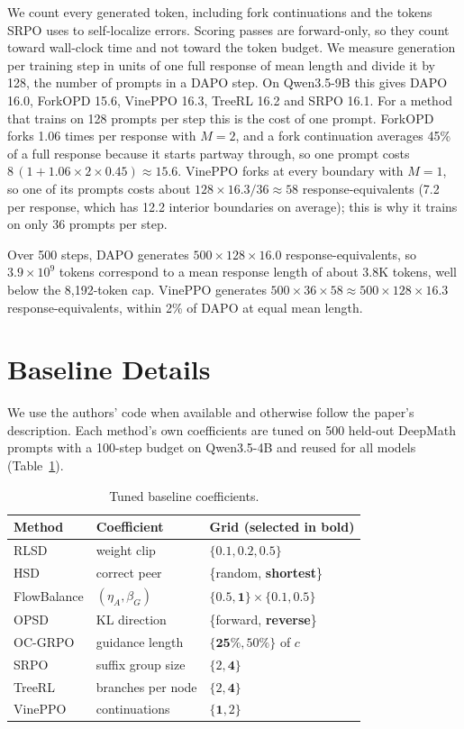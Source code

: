 \documentclass[11pt]{article}
\newcommand{\method}{ForkOPD}
\theoremstyle{remark}
\begin{document}
We count every generated token, including fork continuations and the tokens SRPO uses to self-localize errors. Scoring passes are forward-only, so they count toward wall-clock time and not toward the token budget. We measure generation per training step in units of one full response of mean length and divide it by 128, the number of prompts in a DAPO step. On Qwen3.5-9B this gives DAPO 16.0, \method{} 15.6, VinePPO 16.3, TreeRL 16.2 and SRPO 16.1. For a method that trains on 128 prompts per step this is the cost of one prompt. \method{} forks 1.06 times per response with $M=2$, and a fork continuation averages 45\% of a full response because it starts partway through, so one prompt costs $8\,(1+1.06\times2\times0.45)\approx15.6$. VinePPO forks at every boundary with $M=1$, so one of its prompts costs about $128\times16.3/36\approx58$ response-equivalents (7.2 per response, which has 12.2 interior boundaries on average); this is why it trains on only 36 prompts per step.

Over 500 steps, DAPO generates $500\times128\times16.0$ response-equivalents, so $3.9\times10^9$ tokens correspond to a mean response length of about 3.8K tokens, well below the 8{,}192-token cap. VinePPO generates $500\times36\times58\approx500\times128\times16.3$ response-equivalents, within 2\% of DAPO at equal mean length.

\section{Baseline Details}
\label{app:baselines}

We use the authors' code when available and otherwise follow the paper's description. Each method's own coefficients are tuned on 500 held-out DeepMath prompts with a 100-step budget on Qwen3.5-4B and reused for all models (Table~\ref{tab:baselines}).

\begin{table}[h]
\centering
\small
\setlength{\tabcolsep}{2.5pt}
\footnotesize
\begin{tabular}{lll}
\toprule
Method & Coefficient & Grid (selected in bold) \\
\midrule
RLSD & weight clip & $\{0.1, \mathbf{0.2}, 0.5\}$ \\
HSD & correct peer & \{random, \textbf{shortest}\} \\
FlowBalance & $(\eta_A,\beta_G)$ & $\{0.5,\mathbf{1}\}\times\{\mathbf{0.1},0.5\}$ \\
OPSD & KL direction & \{forward, \textbf{reverse}\} \\
OC-GRPO & guidance length & $\{\mathbf{25\%}, 50\%\}$ of $c$ \\
SRPO & suffix group size & $\{2,\mathbf{4}\}$ \\
TreeRL & branches per node & $\{2,\mathbf{4}\}$ \\
VinePPO & continuations & $\{\mathbf{1},2\}$ \\
\bottomrule
\end{tabular}
\caption{Tuned baseline coefficients.}
\label{tab:baselines}
\end{table}
\end{document}
